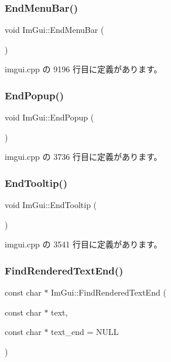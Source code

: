 \subsubsection{\texorpdfstring{End\+Menu\+Bar()}{EndMenuBar()}}
{\footnotesize\ttfamily void Im\+Gui\+::\+End\+Menu\+Bar (\begin{DoxyParamCaption}{ }\end{DoxyParamCaption})}



 imgui.\+cpp の 9196 行目に定義があります。

\mbox{\label{namespace_im_gui_aa6a9b5696f2ea7eed7683425fc77b8f2}} 
\subsubsection{\texorpdfstring{End\+Popup()}{EndPopup()}}
{\footnotesize\ttfamily void Im\+Gui\+::\+End\+Popup (\begin{DoxyParamCaption}{ }\end{DoxyParamCaption})}



 imgui.\+cpp の 3736 行目に定義があります。

\mbox{\label{namespace_im_gui_ac8d75c160cfdf43d512f773ca133a1c6}} 
\subsubsection{\texorpdfstring{End\+Tooltip()}{EndTooltip()}}
{\footnotesize\ttfamily void Im\+Gui\+::\+End\+Tooltip (\begin{DoxyParamCaption}{ }\end{DoxyParamCaption})}



 imgui.\+cpp の 3541 行目に定義があります。

\mbox{\label{namespace_im_gui_a7671e1dbc803a31b06081b52a771d83f}} 
\subsubsection{\texorpdfstring{Find\+Rendered\+Text\+End()}{FindRenderedTextEnd()}}
{\footnotesize\ttfamily const char $\ast$ Im\+Gui\+::\+Find\+Rendered\+Text\+End (\begin{DoxyParamCaption}\item[{const char $\ast$}]{text,  }\item[{const char $\ast$}]{text\+\_\+end = {\ttfamily NULL} }\end{DoxyParamCaption})}



